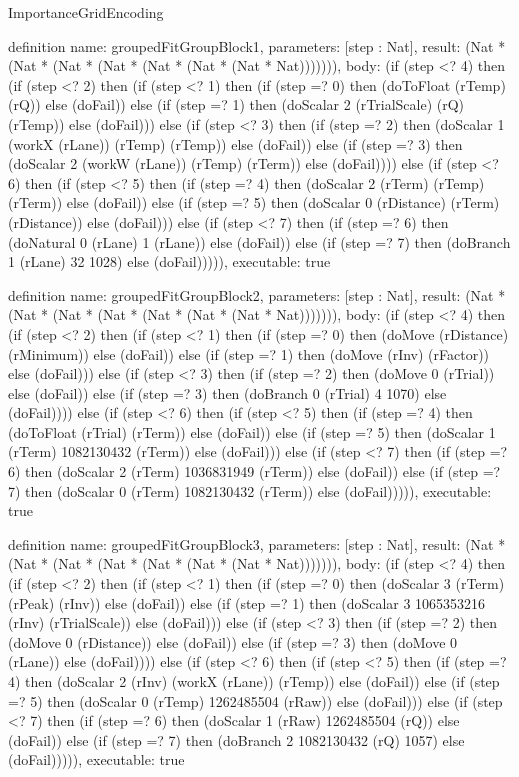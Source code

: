 \begin{lexlean}{ImportanceGridEncoding}
\begin{semanticmodule}
definition{
  name: groupedFitGroupBlock1,
  parameters: [step : Nat],
  result: (Nat * (Nat * (Nat * (Nat * (Nat * (Nat * (Nat * Nat))))))),
  body: (if (step <? 4) then
      (if (step <? 2) then
      (if (step <? 1) then
      (if (step =? 0) then (doToFloat (rTemp) (rQ)) else (doFail)) else
      (if (step =? 1) then (doScalar 2 (rTrialScale) (rQ) (rTemp)) else (doFail))) else
      (if (step <? 3) then
      (if (step =? 2) then (doScalar 1 (workX (rLane)) (rTemp) (rTemp)) else (doFail)) else
      (if (step =? 3) then (doScalar 2 (workW (rLane)) (rTemp) (rTerm)) else (doFail)))) else
      (if (step <? 6) then
      (if (step <? 5) then
      (if (step =? 4) then (doScalar 2 (rTerm) (rTemp) (rTerm)) else (doFail)) else
      (if (step =? 5) then (doScalar 0 (rDistance) (rTerm) (rDistance)) else (doFail))) else
      (if (step <? 7) then
      (if (step =? 6) then (doNatural 0 (rLane) 1 (rLane)) else (doFail)) else
      (if (step =? 7) then (doBranch 1 (rLane) 32 1028) else (doFail))))),
  executable: true
}

definition{
  name: groupedFitGroupBlock2,
  parameters: [step : Nat],
  result: (Nat * (Nat * (Nat * (Nat * (Nat * (Nat * (Nat * Nat))))))),
  body: (if (step <? 4) then
      (if (step <? 2) then
      (if (step <? 1) then
      (if (step =? 0) then (doMove (rDistance) (rMinimum)) else (doFail)) else
      (if (step =? 1) then (doMove (rInv) (rFactor)) else (doFail))) else
      (if (step <? 3) then
      (if (step =? 2) then (doMove 0 (rTrial)) else (doFail)) else
      (if (step =? 3) then (doBranch 0 (rTrial) 4 1070) else (doFail)))) else
      (if (step <? 6) then
      (if (step <? 5) then
      (if (step =? 4) then (doToFloat (rTrial) (rTerm)) else (doFail)) else
      (if (step =? 5) then (doScalar 1 (rTerm) 1082130432 (rTerm)) else (doFail))) else
      (if (step <? 7) then
      (if (step =? 6) then (doScalar 2 (rTerm) 1036831949 (rTerm)) else (doFail)) else
      (if (step =? 7) then (doScalar 0 (rTerm) 1082130432 (rTerm)) else (doFail))))),
  executable: true
}

definition{
  name: groupedFitGroupBlock3,
  parameters: [step : Nat],
  result: (Nat * (Nat * (Nat * (Nat * (Nat * (Nat * (Nat * Nat))))))),
  body: (if (step <? 4) then
      (if (step <? 2) then
      (if (step <? 1) then
      (if (step =? 0) then (doScalar 3 (rTerm) (rPeak) (rInv)) else (doFail)) else
      (if (step =? 1) then (doScalar 3 1065353216 (rInv) (rTrialScale)) else (doFail))) else
      (if (step <? 3) then
      (if (step =? 2) then (doMove 0 (rDistance)) else (doFail)) else
      (if (step =? 3) then (doMove 0 (rLane)) else (doFail)))) else
      (if (step <? 6) then
      (if (step <? 5) then
      (if (step =? 4) then (doScalar 2 (rInv) (workX (rLane)) (rTemp)) else (doFail)) else
      (if (step =? 5) then (doScalar 0 (rTemp) 1262485504 (rRaw)) else (doFail))) else
      (if (step <? 7) then
      (if (step =? 6) then (doScalar 1 (rRaw) 1262485504 (rQ)) else (doFail)) else
      (if (step =? 7) then (doBranch 2 1082130432 (rQ) 1057) else (doFail))))),
  executable: true
}


\end{semanticmodule}
\end{lexlean}
